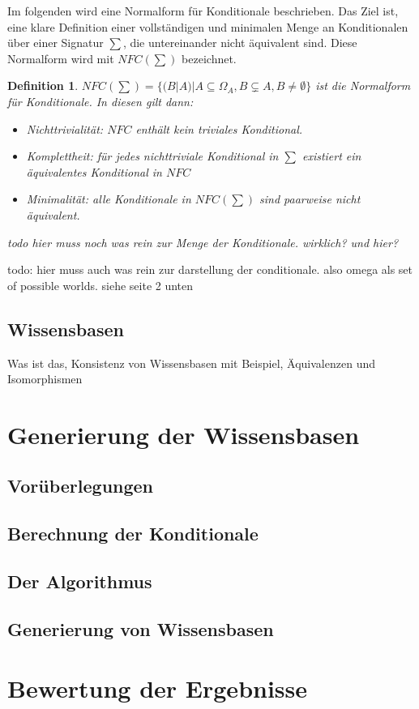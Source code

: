 \documentclass[12pt,a4paper]{article}
\newtheorem{theorem}{Definition}
\begin{document}
Im folgenden wird eine Normalform für Konditionale beschrieben. Das Ziel ist, eine klare Definition einer vollständigen und minimalen  Menge an Konditionalen über einer Signatur $\sum$, die untereinander nicht äquivalent sind. Diese Normalform wird mit $NFC(\sum)$ bezeichnet.
\begin{theorem}
$NFC(\sum) = \{(B|A)|A \subseteq
 \Omega_A, B \subsetneq A, B \neq \emptyset \}$ ist die Normalform für Konditionale. In diesen gilt dann:
 \begin{itemize}
\item{Nichttrivialität: $NFC$ enthält kein triviales Konditional.}
\item{Komplettheit: für jedes nichttriviale Konditional in $\sum$ existiert ein äquivalentes Konditional in $NFC$ }
\item{Minimalität: alle Konditionale in $NFC(\sum)$ sind paarweise nicht äquivalent.}
  \end{itemize}
 todo hier muss noch was rein zur Menge der Konditionale. wirklich? und hier?
\end{theorem}
todo: hier muss auch was rein zur darstellung der conditionale. also omega als set of possible worlds. siehe seite 2 unten
\subsection{Wissensbasen}
Was ist das, Konsistenz von Wissensbasen mit Beispiel, Äquivalenzen und Isomorphismen
\section{Generierung der Wissensbasen}
\subsection{Vorüberlegungen}
\subsection{Berechnung der Konditionale}
\subsection{Der Algorithmus}
\subsection{Generierung von Wissensbasen}
\section{Bewertung der Ergebnisse}

\newpage

 
\end{document}
